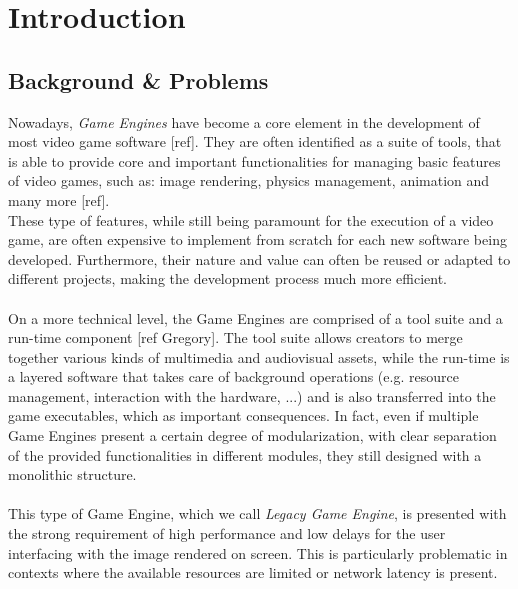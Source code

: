 
\chapter{Introduction}
\label{cap:introduction}

\section{Background \& Problems}
Nowadays, \textit{Game Engines} have become a core element in the development of most video game software [ref]. They are often identified as a suite of tools, that is able to provide core and important functionalities for managing basic features of video games, such as: image rendering, physics management, animation and many more [ref]. \\
These type of features, while still being paramount for the execution of a video game, are often expensive to implement from scratch for each new software being developed. Furthermore, their nature and value can often be reused or adapted to different projects, making the development process much more efficient. \\ \\
On a more technical level, the Game Engines are comprised of a tool suite and a run-time component [ref Gregory]. The tool suite allows creators to merge together various kinds of multimedia and audiovisual assets, while the run-time is a layered software that takes care of background operations (e.g. resource management, interaction with the hardware, ...) and is also transferred into the game executables, which as important consequences. In fact, even if multiple Game Engines present a certain degree of modularization, with clear separation of the provided functionalities in different modules, they still designed with a monolithic structure. \\ \\
This type of Game Engine, which we call \textit{Legacy Game Engine}, is presented with the strong requirement of high performance and low delays for the user interfacing with the image rendered on screen. This is particularly problematic in contexts where the available resources are limited or network latency is present. \\
